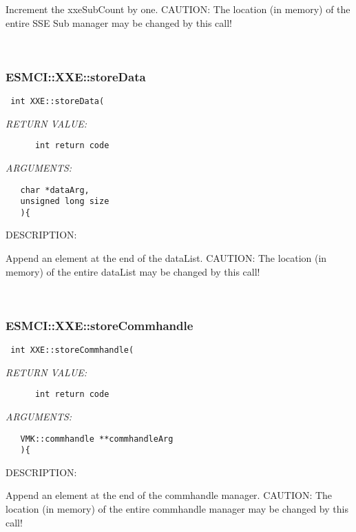     Increment the xxeSubCount by one.
    CAUTION: The location (in memory) of the entire SSE Sub manager may be
             changed by this call! 
 
\mbox{}\hrulefill\
 
\subsubsection [ESMCI::XXE::storeData] {ESMCI::XXE::storeData}


  
\begin{verbatim} int XXE::storeData(\end{verbatim}{\em RETURN VALUE:}
\begin{verbatim}      int return code\end{verbatim}{\em ARGUMENTS:}
\begin{verbatim}   char *dataArg,
   unsigned long size
   ){\end{verbatim}
{\sf DESCRIPTION:\\ }


    Append an element at the end of the dataList.
    CAUTION: The location (in memory) of the entire dataList may be changed by
             this call! 
 
\mbox{}\hrulefill\
 
\subsubsection [ESMCI::XXE::storeCommhandle] {ESMCI::XXE::storeCommhandle}


  
\begin{verbatim} int XXE::storeCommhandle(\end{verbatim}{\em RETURN VALUE:}
\begin{verbatim}      int return code\end{verbatim}{\em ARGUMENTS:}
\begin{verbatim}   VMK::commhandle **commhandleArg
   ){\end{verbatim}
{\sf DESCRIPTION:\\ }


    Append an element at the end of the commhandle manager.
    CAUTION: The location (in memory) of the entire commhandle manager may be
             changed by this call! 
 
